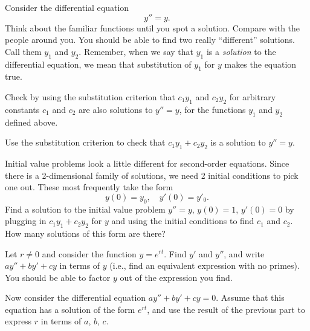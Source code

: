 \documentclass[11pt]{exam}
\begin{document}
\begin{questions}  

\question Consider the differential equation
\[
    y'' = y.
\]
Think about the familiar functions until you spot a solution. Compare with the people around you. You should be able to find two really ``different'' solutions. Call them $y_1$ and $y_2$. Remember, when we say that $y_1$ is a \emph{solution} to the differential equation, we mean that substitution of $y_1$ for $y$ makes the equation true.


\question Check by using the substitution criterion that $c_1 y_1$ and $c_2 y_2$ for arbitrary constants $c_1 $ and $c_2 $ are also solutions to $y'' = y$, for the functions $y_1$ and $y_2$ defined above.


\newpage

\question Use the substitution criterion to check that $c_1 y_1 + c_2 y_2$ is a solution to $y'' = y$.


\question Initial value problems look a little different for second-order equations. Since there is a 2-dimensional family of solutions, we need 2 initial conditions to pick one out. These most frequently take the form
\[
    y(0) = y_0, \quad y'(0) = y'_0.
\]
Find a solution to the initial value problem $y'' = y$, $y(0) = 1$, $y'(0) = 0$ by plugging in $c_1 y_1 + c_2y_2$ for $y$ and using the initial conditions to find $c_1 $ and $c_2$. How many solutions of this form are there?


\question Let $r \ne 0$ and consider the function $y = e^{rt}$. Find $y'$ and $y''$, and write $ay'' + by' + cy$ in terms of $y$ (i.e., find an equivalent expression with no primes). You should be able to factor $y$ out of the expression you find. 


\question Now consider the differential equation $ay'' + by' + cy = 0$. Assume that this equation has a solution of the form $e^{rt}$, and use the result of the previous part to express $r$ in terms of $a$, $b$, $c$.

\end{questions}
\end{document}
